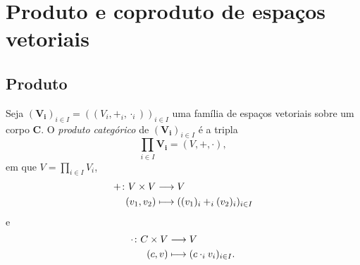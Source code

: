 \section{Produto e coproduto de espaços vetoriais}

\subsection{Produto}

\begin{definition}
Seja $(\bm{V_i})_{i \in I} = ((V_i,+_i,\cdot_i))_{i \in I}$ uma família de espaços vetoriais sobre um corpo $\bm C$. O \emph{produto categórico} de $(\bm{V_i})_{i \in I}$ é a tripla
	\begin{equation*}
	\prod_{i \in I} \bm{V_i} = (V,+,\cdot),
	\end{equation*}
em que $V = \prod_{i \in I} V_i$,
	\begin{align*}
	{+}\colon {V \times V} &\longrightarrow {V} \\{(v_1,v_2)} &\longmapsto ((v_1)_i +_i (v_2)_i)_{i \in I}
	\end{align*}
e
	\begin{align*}
	{\cdot}\colon {C \times V} &\longrightarrow {V} \\{(c,v)} &\longmapsto (c \cdot_i v_i)_{i \in I}.
	\end{align*}
\end{definition}

